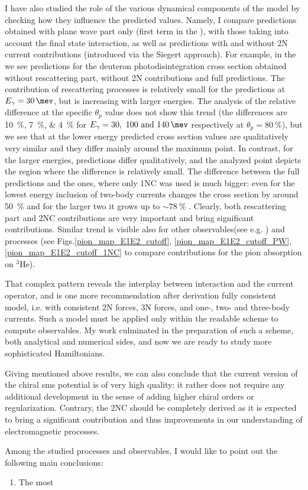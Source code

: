 I have also studied the role of the various dynamical components of the model by checking 
how they influence the predicted values.
Namely, I compare predictions obtained with plane wave part only (first term in the ),
with those taking into account the final state interaction,
as well as predictions with and without 2N current contributions (introduced via the Siegert approach).
For example, in the  we see predictions for the deuteron photodisintegration 
cross section obtained 
without rescattering part, without 2N contributions and full predictions.
The contribution of rescattering processes is relatively small for the predictions at $E_\gamma = \SI{30}{\mev}$,
but is increasing with larger energies. The analysis of the relative difference at the specific 
$\theta_p$ value does not show this trend (the differences are \SIlist{10;7;4}{\percent} 
for $E_\gamma=\SIlist[list-units = single]{30;100;140}{\mev}$ respectively at $\theta_p=\SI{80}{\percent}$),
but we see that
at the lower energy predicted cross section values are qualitatively very similar and they differ
mainly around the maximum point.
In contrast, for the larger energies, predictions differ qualitatively, and the analyzed point 
depicts the region where the difference is relatively small.
The difference between the full predictions and the ones, where only 1NC was used is much bigger:
even for the lowest energy inclusion of two-body currents changes the cross section 
by around \SI{50}{\percent} and for the larger two it grows up to $\sim\SI{78}{\percent}$ .
Clearly, both rescattering part and 2NC contributions are very important and bring significant contributions.
Similar trend is visible also for other observables(see e.g. ) and processes 
(see Figs.\ref{pion_map_E1E2_cutoff}, \ref{pion_map_E1E2_cutoff_PW}, \ref{pion_map_E1E2_cutoff_1NC}
to compare contributions for the pion absorption on $^3$He).

That complex pattern reveals the interplay between interaction and the current operator, and
is one more recommendation after derivation fully consistent model, i.e. with consistent 2N
forces, 3N forces, and one-, two- and three-body currents.
Such a model must be applied only within the readable scheme to compute observables.
My work culminated in the preparation of such a scheme, both analytical and numerical
sides, and now we are ready to study more sophisticated Hamiltonians.

Giving mentioned above results, we can also conclude that the current version of 
the chiral \gls{sms} potential is of very high quality:
it rather does not require any additional development in the sense of adding higher chiral orders or regularization.
Contrary, the 2NC should be completely derived as it is expected to bring 
a significant contribution and thus improvements in our understanding of electromagnetic processes.

Among the studied processes and observables, I would like to point out the following 
main conclusions:

\begin{enumerate}
    \item The most 
\end{enumerate}

